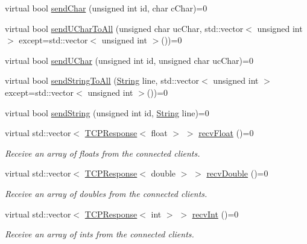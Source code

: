 \begin{DoxyCompactItemize}
\item 
virtual bool \hyperlink{class_rad_j_a_v_1_1_networking_1_1_tcpip_server_a2004f9c706b743af1555a487b8d5e980}{send\+Char} (unsigned int id, char c\+Char)=0
\item 
virtual bool \hyperlink{class_rad_j_a_v_1_1_networking_1_1_tcpip_server_a9dcb14e9366e92436de6c604722424f1}{send\+U\+Char\+To\+All} (unsigned char uc\+Char, std\+::vector$<$ unsigned int $>$ except=std\+::vector$<$ unsigned int $>$())=0
\item 
virtual bool \hyperlink{class_rad_j_a_v_1_1_networking_1_1_tcpip_server_a5fee9e1d19e38a5c88773d664d9b5641}{send\+U\+Char} (unsigned int id, unsigned char uc\+Char)=0
\item 
virtual bool \hyperlink{class_rad_j_a_v_1_1_networking_1_1_tcpip_server_a4259c3a04b3b0eb6ffaf175f5a779b2b}{send\+String\+To\+All} (\hyperlink{class_rad_j_a_v_1_1_string}{String} line, std\+::vector$<$ unsigned int $>$ except=std\+::vector$<$ unsigned int $>$())=0
\item 
virtual bool \hyperlink{class_rad_j_a_v_1_1_networking_1_1_tcpip_server_a009afc6e3d61e200109d39f90a692cc9}{send\+String} (unsigned int id, \hyperlink{class_rad_j_a_v_1_1_string}{String} line)=0
\item 
virtual std\+::vector$<$ \hyperlink{class_rad_j_a_v_1_1_networking_1_1_t_c_p_response}{T\+C\+P\+Response}$<$ float $>$ $>$ \hyperlink{class_rad_j_a_v_1_1_networking_1_1_tcpip_server_a99113c9c8db6b16c804c8efefd0fedae}{recv\+Float} ()=0
\begin{DoxyCompactList}\small\item\em Receive an array of floats from the connected clients. \end{DoxyCompactList}\item 
virtual std\+::vector$<$ \hyperlink{class_rad_j_a_v_1_1_networking_1_1_t_c_p_response}{T\+C\+P\+Response}$<$ double $>$ $>$ \hyperlink{class_rad_j_a_v_1_1_networking_1_1_tcpip_server_a42628f9e5e784604d970fea3fce7d5c9}{recv\+Double} ()=0
\begin{DoxyCompactList}\small\item\em Receive an array of doubles from the connected clients. \end{DoxyCompactList}\item 
virtual std\+::vector$<$ \hyperlink{class_rad_j_a_v_1_1_networking_1_1_t_c_p_response}{T\+C\+P\+Response}$<$ int $>$ $>$ \hyperlink{class_rad_j_a_v_1_1_networking_1_1_tcpip_server_a728b63e038645a7da857c1e1e628a249}{recv\+Int} ()=0
\begin{DoxyCompactList}\small\item\em Receive an array of ints from the connected clients. \end{DoxyCompactList}\item 

\end{DoxyCompactItemize}
